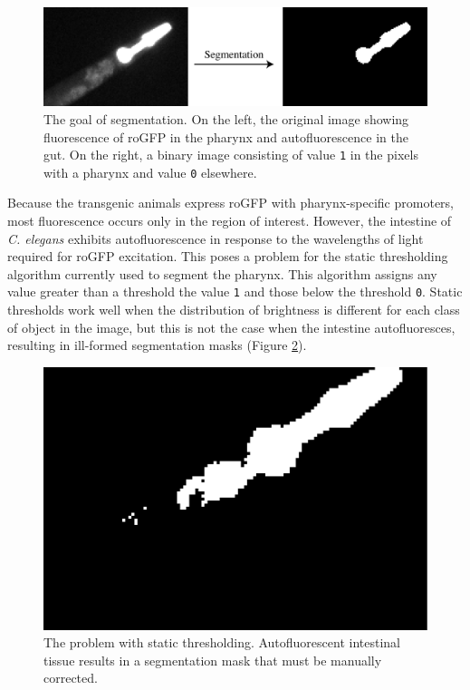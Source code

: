 \begin{figure}[ht]
    \centering
    \includegraphics[scale=.25]{Figures/rendered_files/segmentation_description}
    \decoRule
    \caption[Segmentation of a fluorescence image]{The goal of segmentation. On the left, the original image showing fluorescence of roGFP in the pharynx and autofluorescence in the gut. On the right, a binary image consisting of value \texttt{1} in the pixels with a pharynx and value \texttt{0} elsewhere.}
    \label{fig:SegmentationExample}
\end{figure}

Because the transgenic animals express roGFP with pharynx-specific promoters, most fluorescence occurs only in the region of interest. However, the intestine of \textit{C. elegans} exhibits autofluorescence in response to the wavelengths of light required for roGFP excitation. This poses a problem for the static thresholding algorithm currently used to segment the pharynx. This algorithm assigns any value greater than a threshold the value \texttt{1} and those below the threshold \texttt{0}. Static thresholds work well when the distribution of brightness is different for each class of object in the image, but this is not the case when the intestine autofluoresces, resulting in ill-formed segmentation masks (Figure \ref{fig:SegmentationNaive}).

\begin{figure}[ht]
    \centering
    \includegraphics[scale=.25]{Figures/rendered_files/segmentation_naive}
    \decoRule
    \caption[The problem with static thresholding]{The problem with static thresholding. Autofluorescent intestinal tissue results in a segmentation mask that must be manually corrected.}
    \label{fig:SegmentationNaive}
\end{figure}

